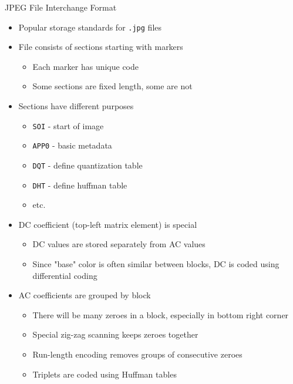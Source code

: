 \documentclass[10pt,aspectratio=169]{beamer}
\begin{document}
\begin{frame}[allowframebreaks]{JPEG File Interchange Format}
	\begin{itemize}
		\item Popular storage standards for \texttt{.jpg} files
		\item File consists of sections starting with markers
		\begin{itemize}
			\item Each marker has unique code
			\item Some sections are fixed length, some are not
		\end{itemize}
		\item Sections have different purposes	
		\begin{itemize}
			\item \texttt{SOI} - start of image
			\item \texttt{APP0} - basic metadata
			\item \texttt{DQT} - define quantization table
			\item \texttt{DHT} - define huffman table
			\item etc.
		\end{itemize}
		\framebreak
		\item DC coefficient (top-left matrix element) is special
		\begin{itemize}
			\item DC values are stored separately from AC values
			\item Since "base" color is often similar between blocks, DC is coded using differential coding
		\end{itemize}
		\item AC coefficients are grouped by block
		\begin{itemize}
			\item There will be many zeroes in a block, especially in bottom right corner
			\item Special zig-zag scanning keeps zeroes together
			\item Run-length encoding removes groups of consecutive zeroes
			\item Triplets are coded using Huffman tables
		\end{itemize}
	\end{itemize}
\end{frame}
\end{document}
